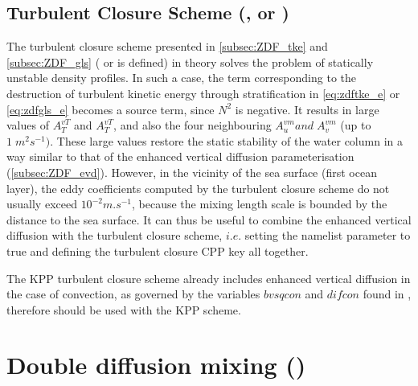 \documentclass[../tex_main/NEMO_manual]{subfiles}
\begin{document}
\subsection[Turbulent closure scheme (\protect\key{zdf}\{tke,gls,osm\})]{Turbulent Closure Scheme (\protect{}, \protect{} or \protect{})}
\label{subsec:ZDF_tcs}

The turbulent closure scheme presented in \autoref{subsec:ZDF_tke} and \autoref{subsec:ZDF_gls} 
( or  is defined) in theory solves the problem of statically 
unstable density profiles. In such a case, the term corresponding to the 
destruction of turbulent kinetic energy through stratification in \autoref{eq:zdftke_e} 
or \autoref{eq:zdfgls_e} becomes a source term, since $N^2$ is negative. 
It results in large values of $A_T^{vT}$ and  $A_T^{vT}$, and also the four neighbouring 
$A_u^{vm} {and}\;A_v^{vm}$ (up to $1\;m^2s^{-1})$. These large values 
restore the static stability of the water column in a way similar to that of the 
enhanced vertical diffusion parameterisation (\autoref{subsec:ZDF_evd}). However, 
in the vicinity of the sea surface (first ocean layer), the eddy coefficients 
computed by the turbulent closure scheme do not usually exceed $10^{-2}m.s^{-1}$, 
because the mixing length scale is bounded by the distance to the sea surface. 
It can thus be useful to combine the enhanced vertical 
diffusion with the turbulent closure scheme, $i.e.$ setting the  
namelist parameter to true and defining the turbulent closure CPP key all together.

The KPP turbulent closure scheme already includes enhanced vertical diffusion 
in the case of convection, as governed by the variables $bvsqcon$ and $difcon$ 
found in , therefore  should be used with the KPP 
scheme. %

\section{Double diffusion mixing (\protect{})}
\label{sec:ZDF_ddm}

\end{document}
